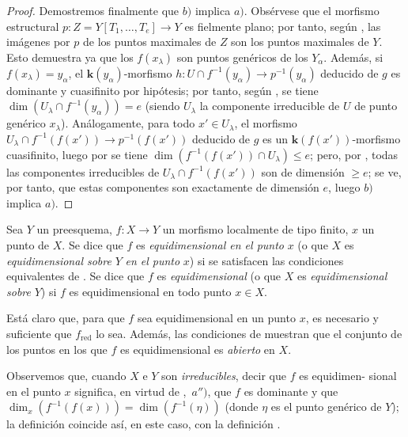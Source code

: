\begin{proof}
Demostremos finalmente que $b)$ implica $a)$.
Obsérvese que el morfismo estructural $p:Z=Y[T_1,\ldots,T_e]\to Y$ es fielmente plano; por tanto, según , las imágenes por $p$ de los puntos maximales de $Z$ son los puntos maximales de $Y$. Esto demuestra ya que los $f(x_\lambda)$ son puntos genéricos de los $Y_\alpha$.
Además, si $f(x_\lambda)=y_\alpha$, el $\boldsymbol k(y_\alpha)$-morfismo $h:U\cap f^{-1}(y_\alpha)\to p^{-1}(y_\alpha)$ deducido de $g$ es dominante y cuasifinito por hipótesis; por tanto, según , se tiene $\dim(U_\lambda\cap f^{-1}(y_\alpha))=e$ (siendo $U_\lambda$ la componente irreducible de $U$ de punto genérico $x_\lambda$).
Análogamente, para todo $x'\in U_\lambda$, el morfismo $U_\lambda\cap f^{-1}(f(x'))\to p^{-1}(f(x'))$ deducido de $g$ es un $\boldsymbol k(f(x'))$-morfismo cuasifinito, luego por  se tiene $\dim(f^{-1}(f(x'))\cap U_\lambda)\leq e$; pero, por , todas las componentes irreducibles de $U_\lambda\cap f^{-1}(f(x'))$ son de dimensión $\geq e$; se ve, por tanto, que estas componentes son exactamente de dimensión $e$, luego $b)$ implica $a)$.
\end{proof}

\begin{definition}[13.3.2]
\label{IV.13.3.2}
Sea $Y$ un preesquema, $f:X\to Y$ un morfismo localmente de tipo finito, $x$ un punto de $X$.
Se dice que $f$ es \emph{equidimensional en el punto} $x$ (o que $X$ es \emph{equidimensional sobre} $Y$ \emph{en el punto} $x$) si se satisfacen las condiciones equivalentes de .
Se dice que $f$ es \emph{equidimensional} (o que $X$ es \emph{equidimensional sobre} $Y$) si $f$ es equidimensional en todo punto $x\in X$.
\end{definition}

Está claro que, para que $f$ sea equidimensional en un punto $x$, es necesario y suficiente que $f_{\mathrm{red}}$ lo sea.
Además, las condiciones de  muestran que el conjunto de los puntos en los que $f$ es equidimensional es \emph{abierto} en $X$.

Observemos que, cuando $X$ e $Y$ son \emph{irreducibles}, decir que $f$ es equidimen-
sional en el punto $x$ significa, en virtud de ,~$a'')$, que $f$ es dominante y que $\dim_x(f^{-1}(f(x)))=\dim(f^{-1}(\eta))$ (donde $\eta$ es el punto genérico de $Y$); la definición  coincide así, en este caso, con la definición .

